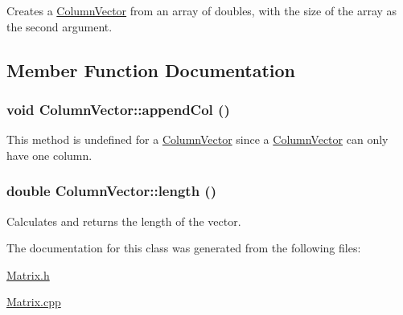 Creates a \hyperlink{class_column_vector}{ColumnVector} from an array of doubles, with the size of the array as the second argument. 



\subsection{Member Function Documentation}
\hypertarget{class_column_vector_0e67b7831d9d4c02691056a72abc6975}{
\subsubsection[{appendCol}]{\setlength{\rightskip}{0pt plus 5cm}void ColumnVector::appendCol ()}}
\label{class_column_vector_0e67b7831d9d4c02691056a72abc6975}


This method is undefined for a \hyperlink{class_column_vector}{ColumnVector} since a \hyperlink{class_column_vector}{ColumnVector} can only have one column. 

\hypertarget{class_column_vector_66329a870ee70b5cd93879d3be247b21}{
\subsubsection[{length}]{\setlength{\rightskip}{0pt plus 5cm}double ColumnVector::length ()}}
\label{class_column_vector_66329a870ee70b5cd93879d3be247b21}


Calculates and returns the length of the vector. 



The documentation for this class was generated from the following files:\begin{CompactItemize}
\item 
\hyperlink{_matrix_8h}{Matrix.h}\item 
\hyperlink{_matrix_8cpp}{Matrix.cpp}\end{CompactItemize}
